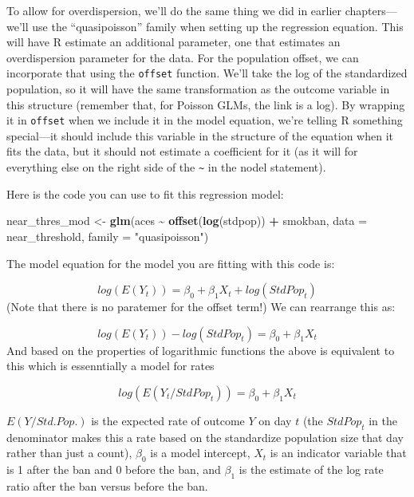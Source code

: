 \documentclass[
]{book}
\newenvironment{Shaded}{\begin{snugshade}}{\end{snugshade}}
\newcommand{\AttributeTok}[1]{\textcolor[rgb]{0.13,0.29,0.53}{#1}}
\newcommand{\FunctionTok}[1]{\textcolor[rgb]{0.13,0.29,0.53}{\textbf{#1}}}
\newcommand{\NormalTok}[1]{#1}
\newcommand{\OtherTok}[1]{\textcolor[rgb]{0.56,0.35,0.01}{#1}}
\newcommand{\SpecialCharTok}[1]{\textcolor[rgb]{0.81,0.36,0.00}{\textbf{#1}}}
\newcommand{\StringTok}[1]{\textcolor[rgb]{0.31,0.60,0.02}{#1}}
\begin{document}
To allow for overdispersion, we'll do the same thing we did in earlier chapters---we'll use the ``quasipoisson'' family when setting up the regression equation. This will have R estimate an additional parameter, one that estimates an overdispersion parameter for the data. For the population offset, we can incorporate that using the \texttt{offset} function. We'll take the log of the standardized population, so it will have the same transformation as the outcome variable in this structure (remember that, for Poisson GLMs, the link is a log). By wrapping it in \texttt{offset} when we include it in the model equation, we're telling R something special---it should include this variable in the structure of the equation when it fits the data, but it should not estimate a coefficient for it (as it will for everything else on the right side of the \texttt{\textasciitilde{}} in the nodel statement).

Here is the code you can use to fit this regression model:

\begin{Shaded}
\begin{Highlighting}[]
\NormalTok{near\_thres\_mod }\OtherTok{\textless{}{-}} \FunctionTok{glm}\NormalTok{(aces }\SpecialCharTok{\textasciitilde{}} \FunctionTok{offset}\NormalTok{(}\FunctionTok{log}\NormalTok{(stdpop)) }\SpecialCharTok{+}\NormalTok{ smokban, }
                      \AttributeTok{data =}\NormalTok{ near\_threshold, }
                      \AttributeTok{family =} \StringTok{"quasipoisson"}\NormalTok{)}
\end{Highlighting}
\end{Shaded}

The model equation for the model you are fitting with this code is:

\[
log(E(Y_t)) = \beta_0 + \beta_1 X_t + log(StdPop_t)
\]
(Note that there is no paratemer for the offset term!) We can rearrange this as:

\[
log(E(Y_t)) - log(StdPop_t) = \beta_0 + \beta_1 X_t 
\]
And based on the properties of logarithmic functions the above is equivalent to this which is essenntially a model for rates

\[
log(E(Y_t/StdPop_t)) = \beta_0 + \beta_1 X_t 
\]

\(E(Y/Std.Pop.)\) is the expected rate of outcome \(Y\) on day \(t\) (the \(StdPop_t\) in the denominator makes this a rate based on the standardize population size that day rather than just a count), \(\beta_0\) is a model intercept, \(X_t\) is an indicator variable that is 1 after the ban and 0 before the ban, and \(\beta_1\) is the estimate of the log rate ratio after the ban versus before the ban.
\end{document}
